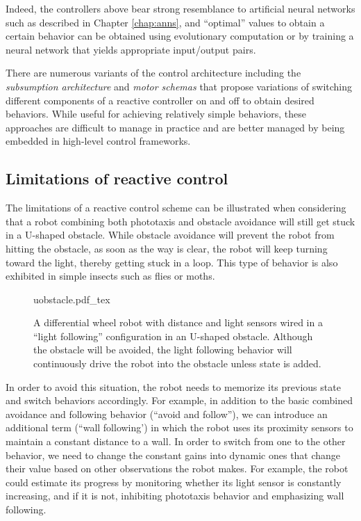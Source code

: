 Indeed, the controllers above bear strong resemblance to artificial neural networks such as described in Chapter \ref{chap:anns}, and ``optimal'' values to obtain a certain behavior can be obtained using evolutionary computation \cite{floreano1998evolutionary} or by training a neural network that yields appropriate input/output pairs.

There are numerous variants of the control architecture including the \emph{subsumption architecture} \cite{brooks1990elephants} and \emph{motor schemas} \cite{arkin1989motor} that propose variations of switching different components of a reactive controller on and off to obtain desired behaviors. While useful for achieving relatively simple behaviors, these approaches are difficult to manage in practice and are better managed by being embedded in high-level control frameworks.

\subsection{Limitations of reactive control}
The limitations of a reactive control scheme can be illustrated when considering that a robot combining both phototaxis and obstacle avoidance will still get stuck in a U-shaped obstacle. While obstacle avoidance will prevent the robot from hitting the obstacle, as soon as the way is clear, the robot will keep turning toward the light, thereby getting stuck in a loop. This type of behavior is also exhibited in simple insects such as flies or moths.

\begin{figure}
\centering
    \def\svgwidth{0.72\textwidth}
    {uobstacle.pdf_tex}
    \caption{\label{fig:uobstacle}A differential wheel robot with distance and light sensors wired in a ``light following'' configuration in an U-shaped obstacle. Although the obstacle will be avoided, the light following behavior will continuously drive the robot into the obstacle unless state is added.}
\end{figure}


In order to avoid this situation, the robot needs to memorize its previous state and switch behaviors accordingly. For example, in addition to the basic combined avoidance and following behavior (``avoid and follow''), we can introduce an additional term (``wall following') in which the robot uses its proximity sensors to maintain a constant distance to a wall. In order to switch from one to the other behavior, we need to change the constant gains into dynamic ones that change their value based on other observations the robot makes. For example, the robot could estimate its progress by monitoring whether its light sensor is constantly increasing, and if it is not, inhibiting phototaxis behavior and emphasizing wall following.

